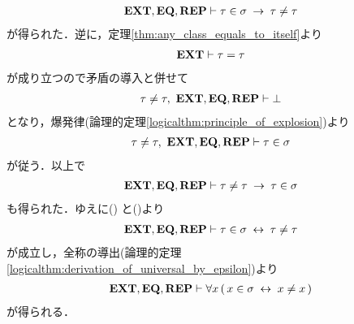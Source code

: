 \begin{sketch}
\begin{align}
			\mbox{{\bf EXT}},\mbox{{\bf EQ}},\mbox{{\bf REP}} \vdash \tau \in \sigma \hspace{0.25em}\rightarrow\hspace{0.25em} \tau \neq \tau
			\label{fom:thm_emptyset_is_a_set_3}
		\end{align}
		が得られた．逆に，定理\ref{thm:any_class_equals_to_itself}より
		\begin{align}
			\mbox{{\bf EXT}} \vdash \tau = \tau 
		\end{align}
		が成り立つので矛盾の導入と併せて
		\begin{align}
			\tau \neq \tau,\ \mbox{{\bf EXT}},\mbox{{\bf EQ}},\mbox{{\bf REP}} \vdash \bot
		\end{align}
		となり，爆発律(論理的定理\ref{logicalthm:principle_of_explosion})より
		\begin{align}
			\tau \neq \tau,\ \mbox{{\bf EXT}},\mbox{{\bf EQ}},\mbox{{\bf REP}} \vdash \tau \in \sigma
		\end{align}
		が従う．以上で
		\begin{align}
			\mbox{{\bf EXT}},\mbox{{\bf EQ}},\mbox{{\bf REP}} \vdash \tau \neq \tau \hspace{0.25em}\rightarrow\hspace{0.25em} \tau \in \sigma
			\label{fom:thm_emptyset_is_a_set_4}
		\end{align}
		も得られた．ゆえに()
		と()より
		\begin{align}
			\mbox{{\bf EXT}},\mbox{{\bf EQ}},\mbox{{\bf REP}} \vdash \tau \in \sigma \hspace{0.25em}\leftrightarrow\hspace{0.25em} \tau \neq \tau
		\end{align}
		が成立し，全称の導出(論理的定理\ref{logicalthm:derivation_of_universal_by_epsilon})より
		\begin{align}
			\mbox{{\bf EXT}},\mbox{{\bf EQ}},\mbox{{\bf REP}} \vdash 
			\forall x\, (\, x \in \sigma \hspace{0.25em}\leftrightarrow\hspace{0.25em} x \neq x\, )
			\label{fom:thm_emptyset_is_a_set_6}
		\end{align}
		が得られる．
		

\end{sketch}

